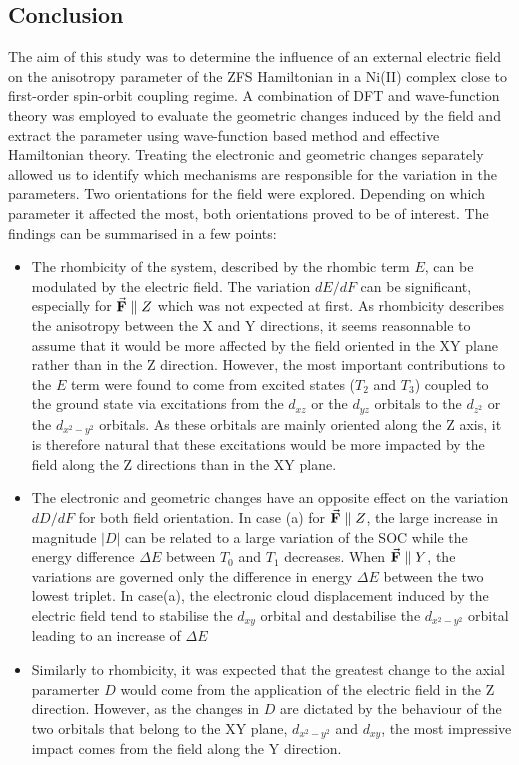 \documentclass[12pt]{report}
\numberwithin{equation}{section}
\begin{document}
\newpage
\subsection{Conclusion}

The aim of this study was to determine the influence of an external electric field on the anisotropy parameter of the ZFS Hamiltonian in a Ni(II) complex close to first-order spin-orbit coupling regime. 
A combination of DFT and wave-function theory was employed to evaluate the geometric changes induced by the field and extract the parameter using wave-function based method and effective Hamiltonian theory.
Treating the electronic and geometric changes separately allowed us to identify which mechanisms are responsible for the variation in the parameters.
Two orientations for the field were explored. Depending on which parameter it affected the most, both orientations proved to be of interest.
The findings can be summarised in a few points:

\begin{itemize}
    \item[(i)] The rhombicity of the system, described by the rhombic term $E$, can be modulated by the electric field. 
    The variation $dE/dF$ can be significant, especially for $\vec{\vb{F}}\parallel Z$ which was not expected at first.
    As rhombicity describes the anisotropy between the X and Y directions, it seems reasonnable to assume that it would be more affected by the field oriented in the XY plane rather than in the Z direction.
    However, the most important contributions to the $E$ term were found to come from excited states ($T_2$ and $T_3$) coupled to the ground state via excitations from the $d_{xz}$ or the $d_{yz}$ orbitals to the $d_{z^2}$ or the $d_{x^2-y^2}$ orbitals.
    As these orbitals are mainly oriented along the Z axis, it is therefore natural that these excitations would be more impacted by the field along the Z directions than in the XY plane.
    \item[(ii)] The electronic and geometric changes have an opposite effect on the variation $dD/dF$ for both field orientation. 
    In case (a) for $\vec{\vb{F}}\parallel Z$, the large increase in magnitude $|D|$ can be related to a large variation of the SOC while the energy difference $\Delta E$ between $T_0$ and $T_1$ decreases.
    When $\vec{\vb{F}}\parallel Y$, the variations are governed only the difference in energy $\Delta E$ between the two lowest triplet. 
    In case(a), the electronic cloud displacement induced by the electric field tend to stabilise the $d_{xy}$ orbital and destabilise the $d_{x^2-y^2}$ orbital leading to an increase of $\Delta E$
    \item[(iii)] Similarly to rhombicity, it was expected that the greatest change to the axial paramerter $D$ would come from the application of the electric field in the Z direction.
    However, as the changes in $D$ are dictated by the behaviour of the two orbitals that belong to the XY plane, $d_{x^2-y^2}$ and $d_{xy}$, the most impressive impact comes from the field along the Y direction.
\end{itemize}
\end{document}

